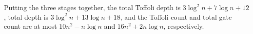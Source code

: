 \documentclass[reprint,amsmath,amssymb,aps,pra]{revtex4-2}
\newtheorem{claim}{Claim}
\begin{document}
Putting the three stages together, the 
total Toffoli depth is $3\log^2{n}+7\log{n}+12$, 
total depth is $3\log^2{n}+13\log{n}+18$, and the 
Toffoli count and total gate count are at most $10n^2-n\log{n}$ and $16n^2+2n\log{n}$, respectively.

\end{document}
